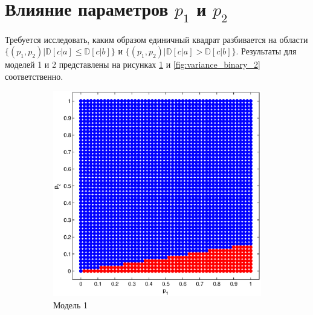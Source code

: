 \documentclass[12pt,a4paper,oneside,fleqn,leqno]{article}
\begin{document}
		\section{Влияние параметров $p_1$ и $p_2$}
			Требуется исследовать, каким образом единичный квадрат разбивается на области $\{(p_1, p_2) | \mathbb{D}[c|a] \leqslant \mathbb{D}[c|b] \}$ и $\{(p_1, p_2) | \mathbb{D}[c|a] > \mathbb{D}[c|b] \}$. Результаты для моделей 1 и 2 представлены на рисунках \ref{fig:variance_binary_1} и \ref{fig:variance_binary_2} соответственно.
			\begin{figure}[H]
				\begin{subfigure}[b]{0.5\textwidth}
					\centering
					\includegraphics[width=1.0\textwidth]{variance_binary_1.eps}
					\caption{Модель 1}
					\label{fig:variance_binary_1}
				\end{subfigure}
				\begin{subfigure}[b]{0.5\textwidth}
					\centering

\end{subfigure}
\end{figure}
\end{document}
